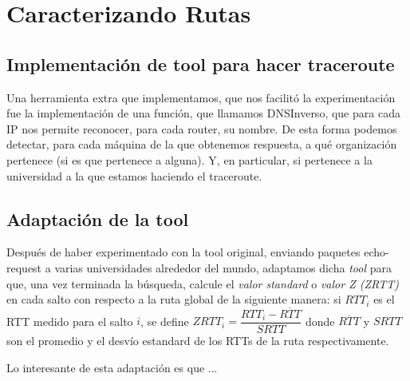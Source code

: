 \documentclass[final,inline,a4paper,narroweqnarray]{ieee}
\let\Oldsection\section
\renewcommand{\section}{\FloatBarrier\Oldsection}
\let\Oldsubsection\subsection
\renewcommand{\subsection}{\FloatBarrier\Oldsubsection}
\begin{document}
\section{Caracterizando Rutas}

  \subsection{Implementación de tool para hacer traceroute}
  Una herramienta extra que implementamos, que nos facilitó la experimentación
  fue la implementación de una función, que llamamos DNSInverso, que para cada 
  IP nos permite reconocer, para cada router, su nombre.
  De esta forma podemos detectar, para cada máquina de la que obtenemos respuesta,
  a qué organización pertenece (si es que pertenece a alguna). Y, en particular,
  si pertenece a la universidad a la que estamos haciendo el traceroute.

  \subsection{Adaptación de la tool}
  Después de haber experimentado con la tool original, enviando paquetes
  echo-request a varias universidades alrededor del mundo, 
  adaptamos dicha \emph{tool} para que, una vez terminada 
  la búsqueda, calcule el \emph{valor standard}  o \emph{valor Z (ZRTT) } 
  en cada salto con respecto a la ruta global de la siguiente manera: si $RTT_i$ 
  es el RTT medido para el salto $i$, se define $ ZRTT_i = \dfrac{RTT_i 
  - \overline{RTT}}{SRTT} $ donde $\overline{RTT}$ y $SRTT$ son el promedio 
  y el desvío estandard de los RTTs de la ruta respectivamente.  

  Lo interesante de esta adaptación es que ...

\end{document}
